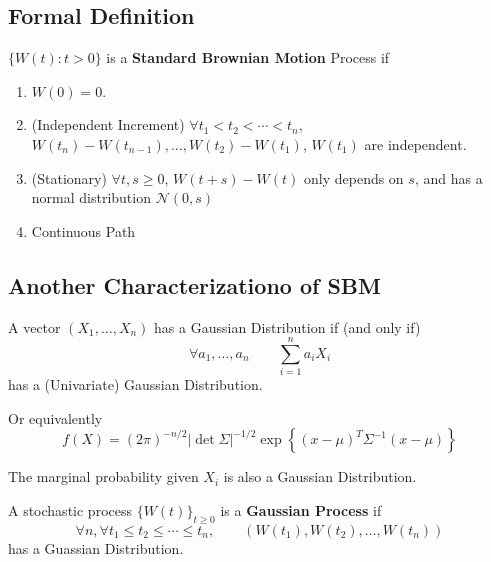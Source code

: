     \subsection{Formal Definition}
        \begin{definition}\label{def:BrownianMotionStd}
            $\{W(t):t>0\}$ is a \textbf{Standard Brownian Motion} Process if
            \begin{enumerate}
                \item $W(0) = 0$.
                \item (Independent Increment) $\forall t_1 < t_2 < \cdots < t_n$, $W(t_n)-W(t_{n-1}), \dots, W(t_2)-W(t_1)$, $W(t_1)$ are independent.
                \item (Stationary) $\forall t,s \ge 0$, $W(t+s) - W(t)$ only depends on $s$, and has a normal distribution $\mathcal{N}(0, s)$
                \item Continuous Path
            \end{enumerate}
        \end{definition}

    \subsection{Another Characterizationo of SBM}
        \begin{definition}
            A vector $(X_1, \dots, X_n)$ has a Gaussian Distribution if (and only if)
            \[ \forall a_1, \dots, a_n \qquad \sum_{i=1}^n a_iX_i \]
            has a (Univariate) Gaussian Distribution.

            Or equivalently
            \[ f(X) = (2\pi)^{-n/2}|\det\Sigma|^{-1/2}\exp\left\{(x-\mu)^T\Sigma^{-1}(x-\mu)\right\} \]
        \end{definition}
        \begin{remark}
            The marginal probability given $X_i$ is also a Gaussian Distribution.
        \end{remark}

        \begin{definition}\label{def:GaussianProcess}
            A stochastic process $\{W(t)\}_{t \ge 0}$ is a \textbf{Gaussian Process} if
            \[ \forall n, \forall t_1 \le t_2 \le \cdots \le t_n, \qquad (W(t_1), W(t_2), \dots, W(t_n))\]
            has a Guassian Distribution.
        \end{definition}

